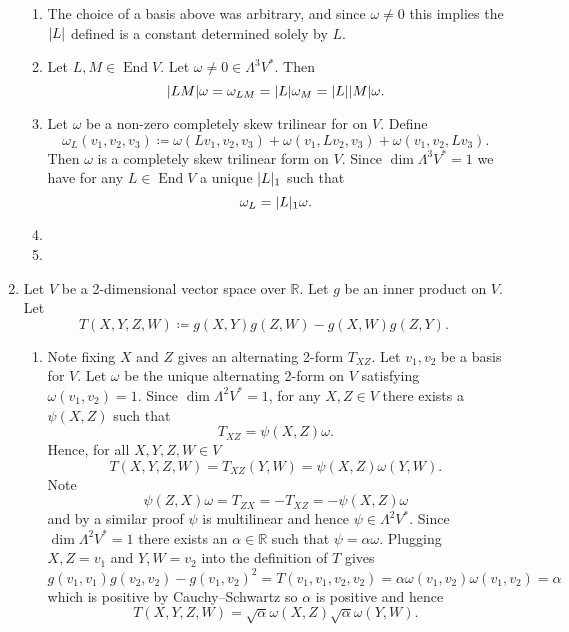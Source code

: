 \documentclass[a4paper, 12pt]{article}
\newcommand{\R}{\mathbb{R}}
\DeclarePairedDelimiter\abs{\lvert}{\rvert}
\DeclareMathOperator{\Endo}{End}
\begin{document}
\begin{enumerate}
\begin{enumerate}
\item The choice of a basis above was arbitrary, and since \(\omega\neq0\) this implies the \(\abs{L}\) defined is a constant determined solely by \(L\).

\item Let \(L,M\in\Endo{V}\). Let \(\omega\neq0\in\Lambda^3V^*\). Then
\[\abs{LM}\omega=\omega_{LM}=\abs L\omega_M=\abs L\abs M\omega.\]

\item Let \(\omega\) be a non-zero completely skew trilinear for on \(V\). Define
\[\omega_L(v_1,v_2,v_3)\coloneqq\omega(Lv_1,v_2,v_3)+\omega(v_1,Lv_2,v_3)+\omega(v_1,v_2,Lv_3).\]
Then \(\omega\) is a completely skew trilinear form on \(V\). Since \(\dim\Lambda^3V^*=1\) we have for any \(L\in\Endo V\) a unique \(\abs{L}_1\) such that
\[\omega_L=\abs{L}_1\omega.\]

\item

\item

\end{enumerate}

\item Let \(V\) be a 2-dimensional vector space over \(\R\). Let \(g\) be an inner product on \(V\). Let
\[T(X,Y,Z,W)\coloneqq g(X,Y)g(Z,W)-g(X,W)g(Z,Y).\]
\begin{enumerate}

\item Note fixing \(X\) and \(Z\) gives an alternating 2-form \(T_{XZ}\). Let \(v_1,v_2\) be a basis for \(V\). Let \(\omega\) be the unique alternating 2-form on \(V\) satisfying \(\omega(v_1,v_2)=1\). Since \(\dim\Lambda^2V^*=1\), for any \(X,Z\in V\) there exists a \(\psi(X,Z)\) such that
\[T_{XZ}=\psi(X,Z)\omega.\]
Hence, for all \(X,Y,Z,W\in V\)
\[T(X,Y,Z,W)=T_{XZ}(Y,W)=\psi(X,Z)\omega(Y,W).\]
Note
\[\psi(Z,X)\omega=T_{ZX}=-T_{XZ}=-\psi(X,Z)\omega\]
and by a similar proof \(\psi\) is multilinear and hence \(\psi\in\Lambda^2V^*\). Since \(\dim\Lambda^2V^*=1\) there exists an \(\alpha\in\R\) such that \(\psi=\alpha\omega\). Plugging \(X,Z=v_1\) and \(Y,W=v_2\) into the definition of \(T\) gives
\[g(v_1,v_1)g(v_2,v_2)-g(v_1,v_2)^2=T(v_1,v_1,v_2,v_2)=\alpha\omega(v_1,v_2)\omega(v_1,v_2)=\alpha\]
which is positive by Cauchy--Schwartz so \(\alpha\) is positive and hence
\[T(X,Y,Z,W)=\sqrt{\alpha}\omega(X,Z)\sqrt{\alpha}\omega(Y,W).\]


\end{enumerate}
\end{enumerate}
\end{document}
